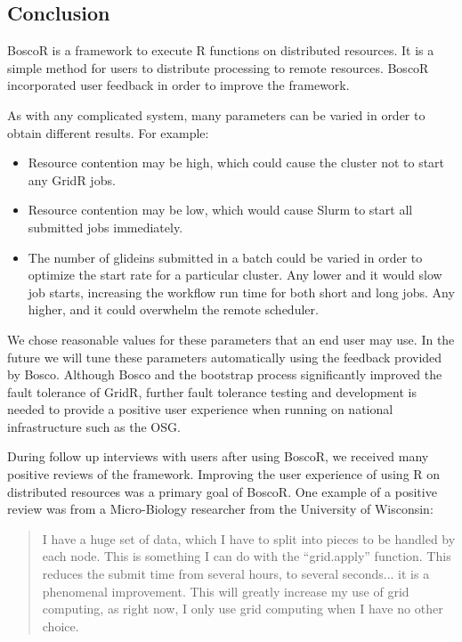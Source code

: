 \subsection{Conclusion}

BoscoR is a framework to execute R functions on distributed resources.  It is a simple method for users to distribute processing to remote resources.  BoscoR incorporated user feedback in order to improve the framework.

As with any complicated system, many parameters can be varied in order to obtain different results.  For example:
\begin{itemize}
\item Resource contention may be high, which could cause the cluster not to start any GridR jobs.
\item Resource contention may be low, which would cause Slurm to start all submitted jobs immediately.
\item The number of glideins submitted in a batch could be varied in order to optimize the start rate for a particular cluster.  Any lower and it would slow job starts, increasing the workflow run time for both short and long jobs.  Any higher, and it could overwhelm the remote scheduler.
\end{itemize}

We chose reasonable values for these parameters that an end user may use.  In the future we will tune these parameters automatically using the feedback provided by Bosco.  Although Bosco and the bootstrap process significantly improved the fault tolerance of GridR, further fault tolerance testing and development is needed to provide a positive user experience when running on national infrastructure such as the OSG.

During follow up interviews with users after using BoscoR, we received many positive reviews of the framework.  Improving the user experience of using R on distributed resources was a primary goal of BoscoR.  One example of a positive review was from a Micro-Biology researcher from the University of Wisconsin:
\begin{quote}
I have a huge set of data, which I have to split into pieces to be handled by each node.  This is something I can do with the ``grid.apply'' function. This reduces the submit time from several hours, to several seconds... it is a  phenomenal improvement. This will greatly increase my use of grid computing, as right now, I only use grid computing when I have no other choice.
\end{quote}

